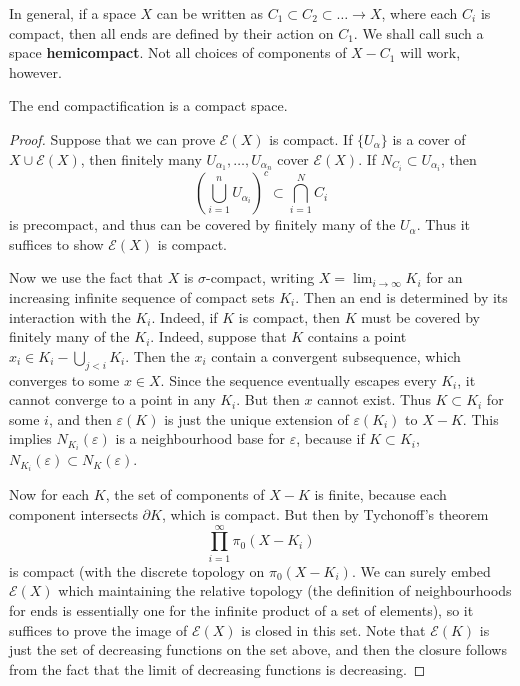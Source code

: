 In general, if a space $X$ can be written as $C_1 \subset C_2 \subset \dots \to X$, where each $C_i$ is compact, then all ends are defined by their action on $C_1$. We shall call such a space {\bf hemicompact}. Not all choices of components of $X - C_1$ will work, however.

\begin{lemma}
    The end compactification is a compact space.
\end{lemma}
\begin{proof}
    Suppose that we can prove $\mathcal{E}(X)$ is compact. If $\{ U_\alpha \}$ is a cover of $X \cup \mathcal{E}(X)$, then finitely many $U_{\alpha_1}, \dots, U_{\alpha_n}$ cover $\mathcal{E}(X)$. If $N_{C_i} \subset U_{\alpha_i}$, then
    \[ \left( \bigcup_{i = 1}^n U_{\alpha_i} \right)^c \subset \bigcap_{i = 1}^N C_i \]
    is precompact, and thus can be covered by finitely many of the $U_\alpha$. Thus it suffices to show $\mathcal{E}(X)$ is compact.

    Now we use the fact that $X$ is $\sigma$-compact, writing $X = \lim_{i \to \infty} K_i$ for an increasing infinite sequence of compact sets $K_i$. Then an end is determined by its interaction with the $K_i$. Indeed, if $K$ is compact, then $K$ must be covered by finitely many of the $K_i$. Indeed, suppose that $K$ contains a point $x_i \in K_i - \bigcup_{j < i} K_i$. Then the $x_i$ contain a convergent subsequence, which converges to some $x \in X$. Since the sequence eventually escapes every $K_i$, it cannot converge to a point in any $K_i$. But then $x$ cannot exist. Thus $K \subset K_i$ for some $i$, and then $\varepsilon(K)$ is just the unique extension of $\varepsilon(K_i)$ to $X - K$. This implies $N_{K_i}(\varepsilon)$ is a neighbourhood base for $\varepsilon$, because if $K \subset K_i$, $N_{K_i}(\varepsilon) \subset N_{K}(\varepsilon)$.

    Now for each $K$, the set of components of $X - K$ is finite, because each component intersects $\partial K$, which is compact. But then by Tychonoff's theorem
    \[ \prod_{i = 1}^\infty \pi_0(X - K_i) \]
    is compact (with the discrete topology on $\pi_0(X - K_i)$. We can surely embed $\mathcal{E}(X)$ which maintaining the relative topology (the definition of neighbourhoods for ends is essentially one for the infinite product of a set of elements), so it suffices to prove the image of $\mathcal{E}(X)$ is closed in this set. Note that $\mathcal{E}(K)$ is just the set of decreasing functions on the set above, and then the closure follows from the fact that the limit of decreasing functions is decreasing.
\end{proof}

